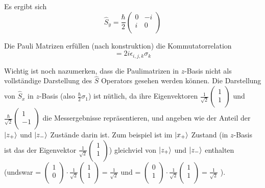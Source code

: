 \documentclass{article}
\begin{document}
Es ergibt sich 
\begin{equation}
\hat{S}_y = \frac{\hbar}{2}\begin{pmatrix}
0& -i \\
i& 0 \\
\end{pmatrix}
\end{equation}

Die Pauli Matrizen erfüllen (nach konstruktion) die Kommutatorrelation
\begin{equation}
	[\sigma_i,\sigma_j]= 2i\epsilon_{i,j,k}\sigma_k
\end{equation}

Wichtig ist noch nazumerken, dass die Paulimatrizen in $z$-Basis nicht als vollständige Darstellung des $\hat{S}$ Operators gesehen werden können. Die Darstellung von $\hat{S}_x$ in $z$-Basis (also $\frac{\hbar}{2}\sigma_1$) ist nütlich, da ihre Eigenvektoren $\frac{1}{\sqrt{2}}\begin{pmatrix}
1 \\
1 \\
\end{pmatrix}$ und $\frac{\hbar}{\sqrt{2}}\begin{pmatrix}
1 \\
-1 \\
\end{pmatrix}$ die Messergebnisse repräsentieren, und angeben wie der Anteil der $\ket{z_+}$ und $\ket{z_-}$ Zustände darin ist. \color{cyan} Zum beispiel ist im $\ket{x_+}$ Zustand (in $z$-Basis ist das der Eigenvektor $\frac{1}{\sqrt{2}}\begin{pmatrix}
1 \\
1 \\
\end{pmatrix}$) gleichviel von $\ket{z_+}$ und $\ket{z_-}$ enthalten (undswar  =
$\begin{pmatrix}
1 \\
0 \\
\end{pmatrix}
 \cdot \frac{1}{\sqrt{2}}\begin{pmatrix}
1 \\
1 \\
\end{pmatrix} = \frac{1}{\sqrt{2}}$
und 
 =
$\begin{pmatrix}
0 \\
1 \\
\end{pmatrix}
 \cdot \frac{1}{\sqrt{2}}\begin{pmatrix}
1 \\
1 \\
\end{pmatrix} = \frac{1}{\sqrt{2}}$
).\color{black}
\end{document}
